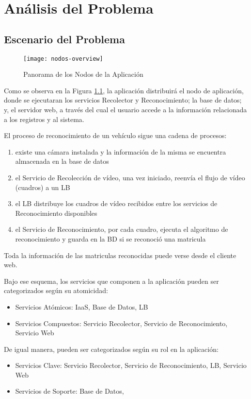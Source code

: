 \chapter{Análisis del Problema}
    \section{Escenario del Problema}
    \begin{figure}[H]
            \centering
            \texttt{[image: nodos-overview]}
            \caption{Panorama de los Nodos de la Aplicación}
            \label{fig:nodos-overview}
    \end{figure}
    
    Como se observa en la Figura \ref{fig:nodos-overview}, la aplicación distribuirá el nodo de aplicación, donde se ejecutaran los servicios Recolector y Reconocimiento; la base de datos; y, el servidor web, a través del cual el usuario accede a la información relacionada a los registros y al sistema.
        
        El proceso de reconocimiento de un vehículo sigue una cadena de procesos:

        \begin{enumerate}
            \item existe una cámara instalada y la información de la misma se encuentra almacenada en la base de datos
            \item el Servicio de Recolección de vídeo, una vez iniciado, reenvía el flujo de vídeo (cuadros) a un LB
            \item el LB distribuye los cuadros de vídeo recibidos entre los servicios de Reconocimiento disponibles
            \item el Servicio de Reconocimiento, por cada cuadro, ejecuta el algoritmo de reconocimiento y guarda en la BD si se reconoció una matricula
        \end{enumerate}    
        
        Toda la información de las matriculas reconocidas puede verse desde el cliente web.
        
        Bajo ese esquema, los servicios que componen a la aplicación pueden ser categorizados según su atomicidad:
        \begin{itemize}
            \item Servicios Atómicos: IaaS, Base de Datos, LB
            \item Servicios Compuestos: Servicio Recolector, Servicio de Reconocimiento, Servicio Web
        \end{itemize}
        De igual manera, pueden ser categorizados según su rol en la aplicación:
        \begin{itemize}
            \item Servicios Clave: Servicio Recolector, Servicio de Reconocimiento, LB, Servicio Web
            \item Servicios de Soporte: Base de Datos,
        \end{itemize}
    

